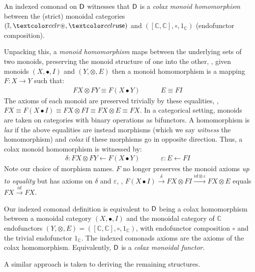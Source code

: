 \begin{proposition}
An indexed comonad on $\mathsf{D}$ witnesses that
$\mathsf{D}$ is a \emph{colax monoid homomorphism} between the (strict)
monoidal categories $(\mathbb{I}, \cseq, \cunit)$ and 
$([\mathbb{C}, \mathbb{C}], 
\circ, 1_{\mathbb{C}})$ (endofunctor composition). 
\end{proposition}
Unpacking this, a \emph{monoid homomorphism} maps between
the underlying sets of two monoids, preserving the monoid structure of one into the other,
\ie{}, given monoids $(X, \bullet, I)$ and $(Y, \otimes, E)$ then
a monoid homomorphism is a mapping $F : X \rightarrow Y$ such that:
\begin{align*}
F X \otimes F Y \equiv F (X \bullet Y) \quad\qquad E \equiv F I
\end{align*}
The axioms of each monoid are preserved trivially by these equalities, 
\eg{}, $F X \equiv F (X \bullet I) \equiv F X \otimes F I \equiv F X \otimes E \equiv F X$. 
In a categorical setting, monoids are taken on categories with binary operations as 
bifunctors. A homomorphism is \emph{lax} if the above equalities are instead morphisms 
(which we say \emph{witness} the homomorphism) and \emph{colax} if these morphisms go in opposite direction.
Thus, a colax monoid homomorphism is witnessed by: 
\begin{align*}
\delta : F X \otimes F Y \leftarrow F (X \bullet Y) \quad\qquad \varepsilon : E \leftarrow F I
\end{align*}
Note our choice of morphism names.  
$F$ no longer preserves the monoid axioms \emph{up to equality} but has axioms on $\delta$ and $\varepsilon$, %
\eg{}, $F (X \bullet I) \xrightarrow{\delta} F X \otimes F I \xrightarrow{id \otimes \varepsilon} F X \otimes E$ equals $F X \xrightarrow{id} F X$. 

Our indexed comonad definition is equivalent to $\mathsf{D}$ being a colax homomorphism between a monoidal category $(X, \bullet, I)$ 
and the monoidal category of $\mathbb{C}$ endofunctors $(Y, \otimes, E) = ([\mathbb{C}, \mathbb{C}], \circ, 1_{\mathbb{C}})$, with endofunctor composition 
$\circ$ and the trivial endofunctor $1_{\mathbb{C}}$. The indexed comonads axioms are the axioms of the colax homomorphism.
Equivalently, $\mathsf{D}$ is a \emph{colax monoidal functor}.

A similar approach is taken to deriving the remaining structures.%

